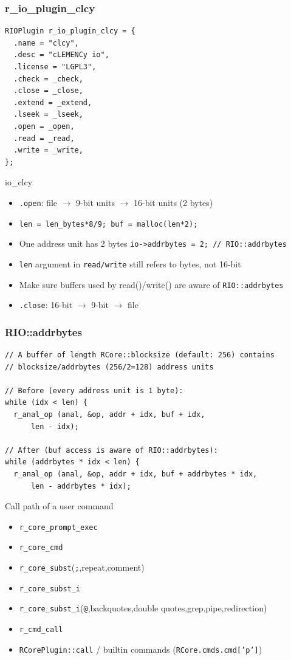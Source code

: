 \documentclass{beamer}
\begin{document}
\begin{frame}[fragile]
  \frametitle{r\_io\_plugin\_clcy}
  \scriptsize
  \begin{verbatim}
RIOPlugin r_io_plugin_clcy = {
  .name = "clcy",
  .desc = "cLEMENCy io",
  .license = "LGPL3",
  .check = _check,
  .close = _close,
  .extend = _extend,
  .lseek = _lseek,
  .open = _open,
  .read = _read,
  .write = _write,
};
  \end{verbatim}
\end{frame}

\begin{frame}{io\_clcy}
  \begin{itemize}
  \item \texttt{.open}: file $\rightarrow$ 9-bit units $\rightarrow$ 16-bit units (2 bytes)
  \item \texttt{len = len_bytes*8/9; buf = malloc(len*2);}
  \item One \alert{address unit} has 2 bytes \texttt{io->addrbytes = 2; // RIO::addrbytes}
  \item \texttt{len} argument in \texttt{read/write} still refers to bytes, not 16-bit
  \item Make sure buffers used by read()/write() are aware of \texttt{RIO::addrbytes}
  \item \texttt{.close}: 16-bit $\rightarrow$ 9-bit $\rightarrow$ file
  \end{itemize}
\end{frame}

\begin{frame}[fragile]
  \frametitle{RIO::addrbytes}
  \scriptsize
  \begin{verbatim}
// A buffer of length RCore::blocksize (default: 256) contains
// blocksize/addrbytes (256/2=128) address units

// Before (every address unit is 1 byte):
while (idx < len) {
  r_anal_op (anal, &op, addr + idx, buf + idx,
      len - idx);

// After (buf access is aware of RIO::addrbytes):
while (addrbytes * idx < len) {
  r_anal_op (anal, &op, addr + idx, buf + addrbytes * idx,
      len - addrbytes * idx);
  \end{verbatim}
\end{frame}

\begin{frame}{Call path of a user command}
  \begin{itemize}
  \item \texttt{r_core_prompt_exec}
  \item \texttt{r_core_cmd}
  \item \texttt{r_core_subst}(\texttt{;},repeat,comment)
  \item \texttt{r_core_subst_i}
  \item \texttt{r_core_subst_i}(\texttt{@},backquotes,double quotes,grep,pipe,redirection)
  \item \texttt{r_cmd_call}
  \item \texttt{RCorePlugin::call} / builtin commands (\texttt{RCore.cmds.cmd['p']})
  \end{itemize}
\end{frame}
\end{document}
